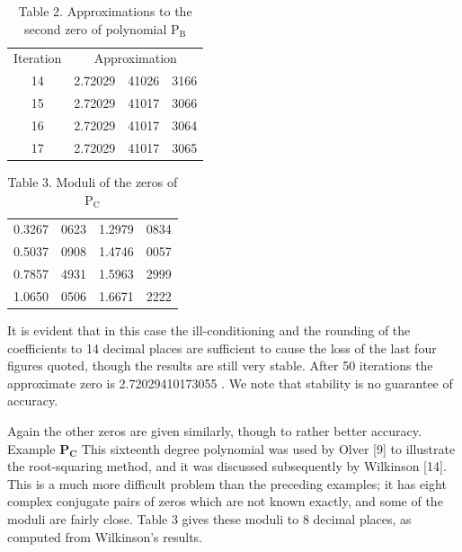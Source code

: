 \documentclass[10pt]{article}
\begin{document}
\begin{table}[h]
\begin{center}
\captionsetup{labelformat=empty}
\caption{Table 2. Approximations to the second zero of polynomial $\mathrm{P}_{\mathrm{B}}$}
\begin{tabular}{cccc}
Iteration & \multicolumn{3}{c}{Approximation} \\
14 & 2.72029 & 41026 & 3166 \\
15 & 2.72029 & 41017 & 3066 \\
16 & 2.72029 & 41017 & 3064 \\
17 & 2.72029 & 41017 & 3065 \\
\end{tabular}
\end{center}
\end{table}

\begin{table}[h]
\begin{center}
\captionsetup{labelformat=empty}
\caption{Table 3. Moduli of the zeros of $\mathrm{P}_{\mathrm{C}}$}
\begin{tabular}{llll}
0.3267 & 0623 & 1.2979 & 0834 \\
0.5037 & 0908 & 1.4746 & 0057 \\
0.7857 & 4931 & 1.5963 & 2999 \\
1.0650 & 0506 & 1.6671 & 2222 \\
\end{tabular}
\end{center}
\end{table}

It is evident that in this case the ill-conditioning and the rounding of the coefficients to 14 decimal places are sufficient to cause the loss of the last four figures quoted, though the results are still very stable. After 50 iterations the approximate zero is 2.72029410173055 . We note that stability is no guarantee of accuracy.

Again the other zeros are given similarly, though to rather better accuracy.\\
Example $\mathbf{P}_{\mathbf{C}}$ This sixteenth degree polynomial was used by Olver [9] to illustrate the root-squaring method, and it was discussed subsequently by Wilkinson [14]. This is a much more difficult problem than the preceding examples; it has eight complex conjugate pairs of zeros which are not known exactly, and some of the moduli are fairly close. Table 3 gives these moduli to 8 decimal places, as computed from Wilkinson's results.
\end{document}
